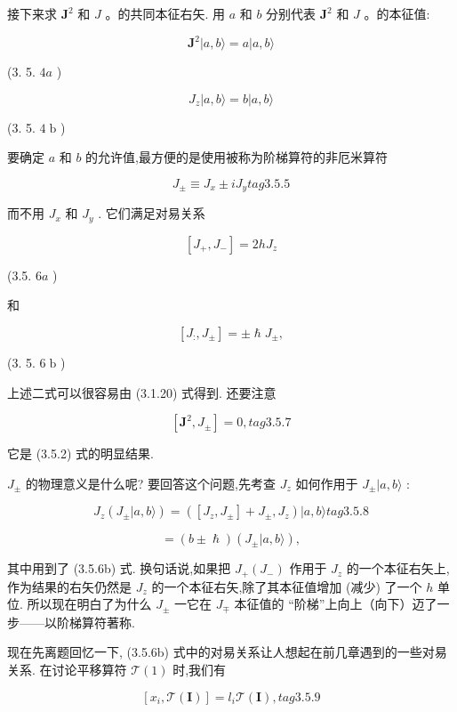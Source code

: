 接下来求 ${\mathbf{J}}^{2}$ 和 $J$ 。的共同本征右矢. 用 $a$ 和 $b$ 分别代表 ${\mathbf{J}}^{2}$ 和 $J$ 。的本征值:

$$
{\mathbf{J}}^{2}\left| {a, b\rangle = a}\right| a, b\rangle
$$

(3. 5. ${4a}$ )

$$
{J}_{z}\left| {a, b\rangle = b}\right| a, b\rangle
$$

(3. 5. $4\mathrm{\;b}$ )

要确定 $a$ 和 $b$ 的允许值,最方便的是使用被称为阶梯算符的非厄米算符

$$
{J}_{ \pm } \equiv {J}_{x} \pm i{J}_{y} tag{3.5.5}
$$

而不用 ${J}_{x}$ 和 ${J}_{y}$ . 它们满足对易关系

$$
\left\lbrack {{J}_{ + },{J}_{ - }}\right\rbrack = {2h}{J}_{z}
$$

(3.5. ${6a}$ )

和

$$
\left\lbrack {{J}_{ : },{J}_{ \pm }}\right\rbrack = \pm \hslash {J}_{ \pm },
$$

(3. 5. $6\mathrm{\;b}$ )

上述二式可以很容易由 (3.1.20) 式得到. 还要注意

$$
\left\lbrack {{\mathbf{J}}^{2},{J}_{ \pm }}\right\rbrack = 0, tag{3.5.7}
$$

它是 (3.5.2) 式的明显结果.

${J}_{ \pm }$ 的物理意义是什么呢? 要回答这个问题,先考查 ${J}_{z}$ 如何作用于 ${J}_{ \pm }|a, b\rangle$ :

$$
{J}_{z}\left( {{J}_{ \pm }|a, b\rangle }\right) = \left( {\left\lbrack {{J}_{z},{J}_{ \pm }}\right\rbrack + {J}_{ \pm },{J}_{z}}\right) |a, b\rangle tag{3.5.8}
$$

$$
= \left( {b \pm \hslash }\right) \left( {{J}_{ \pm }|a, b\rangle }\right) ,
$$

其中用到了 (3.5.6b) 式. 换句话说,如果把 ${J}_{ + }\left( {J}_{ - }\right)$ 作用于 ${J}_{z}$ 的一个本征右矢上,作为结果的右矢仍然是 ${J}_{z}$ 的一个本征右矢,除了其本征值增加 (减少) 了一个 $h$ 单位. 所以现在明白了为什么 ${J}_{ \pm }$ 一它在 ${J}_{ \mp }$ 本征值的 “阶梯”上向上（向下）迈了一步——以阶梯算符著称.

现在先离题回忆一下, (3.5.6b) 式中的对易关系让人想起在前几章遇到的一些对易关系. 在讨论平移算符 $\mathcal{T}\left( 1\right)$ 时,我们有

$$
\left\lbrack {{x}_{i},\mathcal{T}\left( \mathbf{I}\right) }\right\rbrack = {l}_{i}\mathcal{T}\left( \mathbf{I}\right) , tag{3.5.9}
$$

